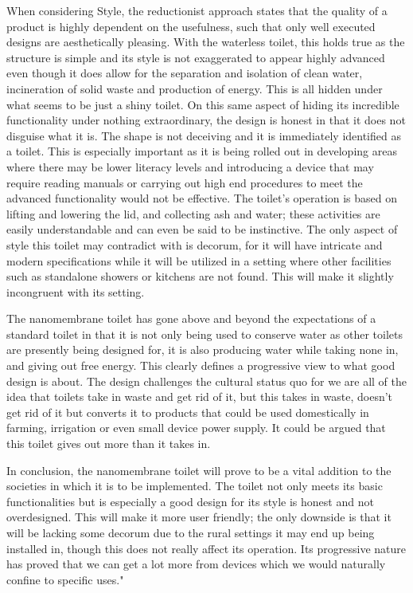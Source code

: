 \documentclass{article}
\begin{document}
When considering Style, the reductionist approach states that the quality of a product is highly dependent on the usefulness, such that only well executed designs are aesthetically pleasing. With the waterless toilet, this holds true as the structure is simple and its style is not exaggerated to appear highly advanced even though it does allow for the separation and isolation of clean water, incineration of solid waste and production of energy. This is all hidden under what seems to be just a shiny toilet. On this same aspect of hiding its incredible functionality under nothing extraordinary, the design is honest in that it does not disguise what it is. The shape is not deceiving and it is immediately identified as a toilet.  This is especially important as it is being rolled out in developing areas where there may be lower literacy levels and introducing a device that may require reading manuals or carrying out high end procedures to meet the advanced functionality would not be effective. The toilet’s operation is based on lifting and lowering the lid, and collecting ash and water; these activities are easily understandable and can even be said to be instinctive. The only aspect of style this toilet may contradict with is decorum, for it will have intricate and modern specifications while it will be utilized in a setting where other facilities such as standalone showers or kitchens are not found. This will make it slightly incongruent with its setting.

The nanomembrane toilet has gone above and beyond the expectations of a standard toilet in that it is not only being used to conserve water as other toilets are presently being designed for, it is also producing water while taking none in, and giving out free energy. This clearly defines a progressive view to what good design is about. The design challenges the cultural status quo for we are all of the idea that toilets take in waste and get rid of it, but this takes in waste, doesn’t get rid of it but converts it to products that could be used domestically in farming, irrigation or even small device power supply. It could be argued that this toilet gives out more than it takes in.

In conclusion, the nanomembrane toilet will prove to be a vital addition to the societies in which it is to be implemented. The toilet not only meets its basic functionalities but is especially a good design for its style is honest and not overdesigned. This will make it more user friendly; the only downside is that it will be lacking some decorum due to the rural settings it may end up being installed in, though this does not really affect its operation. Its progressive nature has proved that we can get a lot more from devices which we would naturally confine to specific uses."
\end{document}

